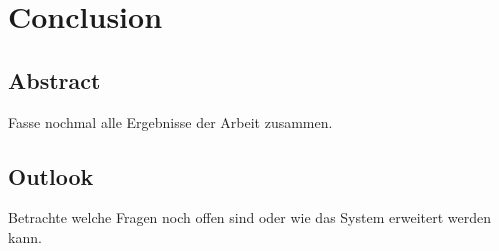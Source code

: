 \chapter{Conclusion}
\label{chap:end}

\section{Abstract}

Fasse nochmal alle Ergebnisse der Arbeit zusammen.

\section{Outlook}

Betrachte welche Fragen noch offen sind oder wie das System erweitert werden kann.